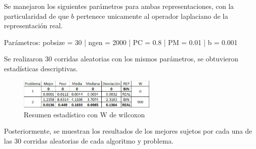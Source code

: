 \documentclass[runningheads]{llncs}
\begin{document}
Se manejaron los siguientes parámetros para ambas representaciones, con la particularidad de que $b$ pertenece unicamente al operador laplaciano de la representación real.

Parámetros: pobsize = 30 | ngen = 2000 | PC = 0.8 | PM = 0.01 | b = 0.001

Se realizaron 30 corridas aleatorias con los mismos parámetros, se obtuvieron estadísticas descriptivas.

\begin{figure}[htbp]
	\centering
	\includegraphics[width=0.60\textwidth]{IMG/R4.jpg}
	\caption{Resumen estadístico con W de wilcoxon}
	\label{fig:r4}
\end{figure}

\newpage

Posteriormente, se muestran los resultados de los mejores sujetos por cada una de las 30 corridas aleatorias de cada algoritmo y problema.
\end{document}
